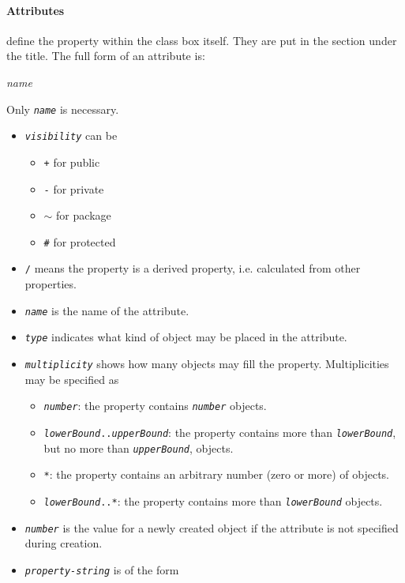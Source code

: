 \paragraph{Attributes} define the property within the class box itself. They are put in the section under the title. The full form of an attribute is:
\begin{syntax}
 \opt{/} \textit{name}    
\end{syntax}
Only \texttt{\textit{name}} is necessary.
\begin{itemize}
\item \texttt{\textit{visibility}} can be
\begin{itemize}
\item \texttt{+} for public
\item \texttt{-} for private
\item \texttt{$\sim$} for package
\item \texttt{\#} for protected
\end{itemize}
\item \texttt{/} means the property is a derived property, i.e. calculated from other properties.
\item \texttt{\textit{name}} is the name of the attribute.
\item \texttt{\textit{type}} indicates what kind of object may be placed in the attribute.
\item \texttt{\textit{multiplicity}} shows how many objects may fill the property. Multiplicities may be specified as
\begin{itemize}
\item \texttt{\textit{number}}: the property contains \texttt{\textit{number}} objects.
\item \texttt{\textit{lowerBound}..\textit{upperBound}}: the property contains more than \texttt{\textit{lowerBound}}, but no more than \texttt{\textit{upperBound}}, objects.
\item \texttt{*}: the property contains an arbitrary number (zero or more) of objects.
\item \texttt{\textit{lowerBound}..*}: the property contains more than \texttt{\textit{lowerBound}} objects.
\end{itemize}
\item \texttt{\textit{number}} is the value for a newly created object if the attribute is not specified during creation.
\item \texttt{\textit{property-string}} is of the form

\end{itemize}
